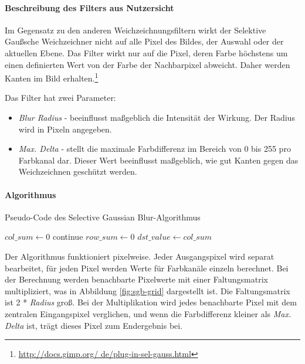 \paragraph{Beschreibung des Filters aus Nutzersicht}
\glqq Im Gegensatz zu den anderen Weichzeichnungsfiltern wirkt der Selektive Gaußsche Weichzeichner nicht auf alle Pixel des Bildes, der Auswahl oder der aktuellen Ebene. Das Filter wirkt nur auf die Pixel, deren Farbe höchstens um einen definierten Wert von der Farbe der Nachbarpixel abweicht. Daher werden Kanten im Bild erhalten.\glqq\footnote{\url{http://docs.gimp.org/	de/plug-in-sel-gauss.html}} 

Das Filter hat zwei Parameter: 
\begin{itemize}
\item \emph{Blur Radius} - beeinflusst maßgeblich die Intensität der Wirkung. Der Radius wird in Pixeln angegeben.
\item \emph{Max. Delta} - stellt die maximale Farbdifferenz im Bereich von 0 bis 255 pro Farbkanal dar. Dieser Wert beeinflusst maßgeblich, wie gut Kanten
gegen das Weichzeichnen geschützt werden.
\end{itemize}


\paragraph{Algorithmus} 
\begin{algorithm}[h]
\caption{Pseudo-Code des \glqq Selective Gaussian Blur\grqq-Algorithmus}
\label{algo:sgb}
\begin{algorithmic}[1]

		\State $col\_sum \gets 0$
			\State continue
			\EndIf
			\State $row\_sum \gets 0$
				\EndIf
				\EndIf
			\EndFor
		\EndFor
		\State $dst\_value \gets col\_sum$
	\EndFor
	\EndFor
\EndFor	
\end{algorithmic}
\end{algorithm}

Der Algorithmus funktioniert pixelweise. Jeder Ausgangspixel wird separat bearbeitet, für jeden Pixel werden Werte für Farbkanäle einzeln berechnet. Bei der Berechnung werden benachbarte Pixelwerte mit einer Faltungsmatrix multipliziert, was in Abbildung \ref{fig:sgb-grid} dargestellt ist. Die Faltungsmatrix ist 2 * \emph{Radius} groß. Bei der Multiplikation wird jedes benachbarte Pixel mit dem zentralen Eingangspixel verglichen, und wenn die Farbdifferenz kleiner als \emph{Max. Delta} ist, trägt dieses Pixel zum Endergebnis bei. 

